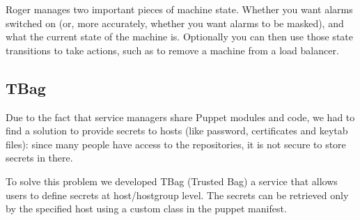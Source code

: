 Roger manages two important pieces of machine state. Whether you want
alarms switched on (or, more accurately, whether you want alarms to be
masked), and what the current state of the machine is. Optionally you can
then use those state transitions to take actions, such as to remove
a machine from a load balancer.

\subsection{TBag}

Due to the fact that service managers share Puppet modules and code, we
had to find a solution to provide secrets to hosts (like password,
certificates and keytab files): since many people have access to the
repositories, it is not secure to store secrets in there.

To solve this problem we developed TBag (Trusted Bag) a service that
allows users to define secrets at host/hostgroup level. The secrets can be
retrieved only by the specified host using a custom class in the puppet
manifest. 

